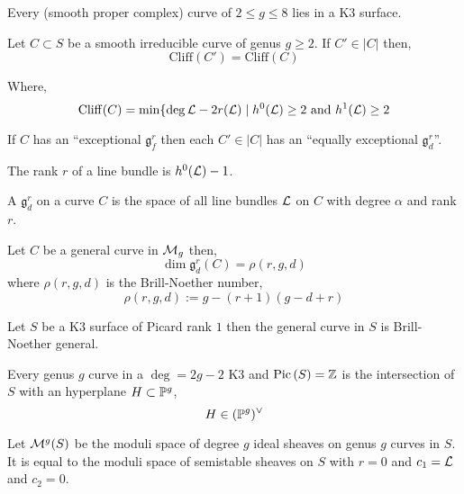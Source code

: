 \documentclass[12pt]{article}
\begin{document}
\begin{thm}
Every (smooth proper complex) curve of $2 \le g \le 8$ lies in a K3 surface.
\end{thm}

\begin{thm}
Let $C \subset S$ be a smooth irreducible curve of genus $g \ge 2$. If $C' \in |C|$ then,
\[ \mathrm{Cliff}(C') = \mathrm{Cliff}(C) \]
\end{thm}

\begin{defn}
Where,
\[ \mathrm{Cliff}(C) = \min \{ \deg{\L}  - 2 r(\L) \mid h^0(\L) \ge 2 \text{ and } h^1(\L) \ge 2 \]
\end{defn}

\newcommand{\g}{\mathfrak{g}}

\begin{rmk}
If $C$ has an ``exceptional $\g^r_f$ then each $C' \in |C|$ has an ``equally exceptional $\g^r_d$''. 
\end{rmk}

\begin{rmk}
The rank $r$ of a line bundle is $h^0(\L) - 1$.
\end{rmk}

\begin{defn}
A $\g^r_d$ on a curve $C$ is the space of all line bundles $\L$ on $C$ with degree $\alpha$ and rank $r$.
\end{defn}

\begin{thm}
Let $C$ be a general curve in $\M_g$ then,
\[ \dim \g^r_d(C) = \rho(r, g, d) \]
where $\rho(r, g, d)$ is the Brill-Noether number,
\[ \rho(r, g, d) := g - (r+1)(g - d + r) \]
\end{thm}

\begin{thm}[Lazarsfeld '86]
Let $S$ be a K3 surface of Picard rank $1$ then the general curve in $S$ is Brill-Noether general.
\end{thm}

\begin{prop}
Every genus $g$ curve in a $\deg = 2g - 2$ K3 and $\Pic{S} = \Z$ is the intersection of $S$ with an hyperplane $H \subset \P^g$,
\[ H \in (\P^g)^\vee \]
\end{prop}

\begin{defn}
Let $\M^g(S)$ be the moduli space of degree $g$ ideal sheaves on genus $g$ curves in $S$. It is equal to the moduli space of semistable sheaves on $S$ with $r = 0$ and $c_1 = \L$ and $c_2 = 0$.
\end{defn}
\end{document}
